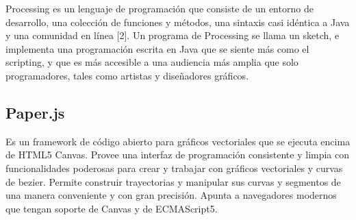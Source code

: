 Processing es un lenguaje de programación que consiste de un entorno de desarrollo, una colección de funciones y métodos, una sintaxis casi idéntica a Java y una comunidad en línea [2]. Un programa de Processing se llama un sketch, e implementa una programación escrita en Java que se siente más como el scripting, y que es más accesible a una audiencia más amplia que solo programadores, tales como artistas y diseñadores gráficos. 



\subsection{Paper.js}

Es un framework de código abierto para gráficos vectoriales que se ejecuta encima de HTML5 Canvas. Provee una interfaz de programación consistente y limpia con funcionalidades poderosas para crear y trabajar con gráficos vectoriales y curvas de bezier. Permite construir trayectorias y manipular sus curvas y segmentos de una manera conveniente y con gran precisión. Apunta a navegadores modernos que tengan soporte de Canvas y de ECMAScript5.
